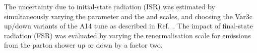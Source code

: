 The uncertainty due to initial-state radiation (ISR) was estimated by
simultaneously varying the \hdamp parameter and the \muR and
\muF scales, and choosing the Var3c up/down variants of the A14 tune
as described in Ref.~\cite{ATL-PHYS-PUB-2017-007}. The impact of
final-state radiation (FSR) was evaluated by varying the renormalisation scale
for emissions from the parton shower up or down by a factor two.
